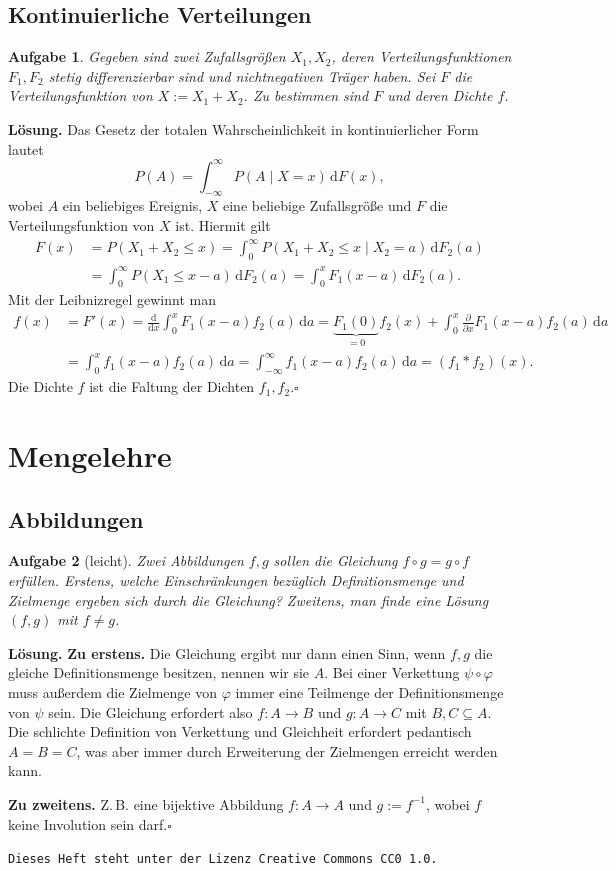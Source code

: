 \documentclass[a4paper,10pt,fleqn,twoside]{scrartcl}
\numberwithin{equation}{section}
\newcommand{\strong}[1]{{\normalfont\sffamily\bfseries #1}}
\renewcommand{\qedsymbol}{\ensuremath{\square}}
\theoremstyle{Aufgabe}
\newtheorem{Aufgabe}{\sffamily Aufgabe}[section]
\begin{document}
\subsection{Kontinuierliche Verteilungen}
\begin{Aufgabe}
Gegeben sind zwei Zufallsgrößen $X_1,X_2$, deren Verteilungsfunktionen
$F_1,F_2$ stetig differenzierbar sind und nichtnegativen Träger haben.
Sei $F$ die Verteilungsfunktion von $X:=X_1+X_2$. Zu bestimmen sind
$F$ und deren Dichte $f$.
\end{Aufgabe}
\strong{Lösung.}
Das Gesetz der totalen Wahrscheinlichkeit in kontinuierlicher Form
lautet
\[P(A) = \int_{-\infty}^\infty P(A\mid X=x)\,\mathrm dF(x),\]
wobei $A$ ein beliebiges Ereignis, $X$ eine beliebige Zufallsgröße
und $F$ die Verteilungsfunktion von $X$ ist. Hiermit gilt
\begin{align*}
F(x) &= P(X_1+X_2\le x)
= \int_0^\infty P(X_1+X_2\le x\mid X_2=a)\,\mathrm dF_2(a)\\
&= \int_0^\infty P(X_1\le x-a)\,\mathrm dF_2(a)
= \int_0^x F_1(x-a)\,\mathrm dF_2(a).
\end{align*}
Mit der Leibnizregel gewinnt man
\begin{align*}
f(x) &= F'(x) = \frac{\mathrm d}{\mathrm dx}\int_0^x F_1(x-a)f_2(a)\,\mathrm da
= \underbrace{F_1(0)}_{=0}f_2(x) + \int_0^x \frac{\partial}{\partial x}F_1(x-a)f_2(a)\,\mathrm da\\
&= \int_0^x f_1(x-a)f_2(a)\,\mathrm da = \int_{-\infty}^\infty f_1(x-a)f_2(a)\,\mathrm da
= (f_1*f_2)(x).
\end{align*}
Die Dichte $f$ ist die Faltung der Dichten $f_1,f_2$.\;\qedsymbol

\section{Mengelehre}
\subsection{Abbildungen}

\begin{Aufgabe}[leicht]
Zwei Abbildungen $f,g$ sollen die Gleichung $f\circ g = g\circ f$
erfüllen. Erstens, welche Einschränkungen bezüglich Definitionsmenge
und Zielmenge ergeben sich durch die Gleichung? Zweitens, man finde
eine Lösung $(f,g)$ mit $f\ne g$.
\end{Aufgabe}
\strong{Lösung.} \strong{Zu erstens.}
Die Gleichung ergibt nur dann einen Sinn,
wenn $f,g$ die gleiche Definitionsmenge besitzen, nennen wir sie
$A$. Bei einer Verkettung $\psi\circ\varphi$ muss außerdem die
Zielmenge von $\varphi$ immer eine Teilmenge der Definitionsmenge
von $\psi$ sein. Die Gleichung erfordert also $f\colon A\to B$ und
$g\colon A\to C$ mit $B,C\subseteq A$. Die schlichte Definition
von Verkettung und Gleichheit erfordert pedantisch $A=B=C$,
was aber immer durch Erweiterung der Zielmengen erreicht werden
kann.

\strong{Zu zweitens.}
Z.\,B. eine bijektive Abbildung $f\colon A\to A$ und
$g:=f^{-1}$, wobei $f$ keine Involution sein darf.\;\qedsymbol

\vfill\noindent
\texttt{Dieses Heft steht unter der Lizenz Creative Commons CC0 1.0.}
\end{document}
